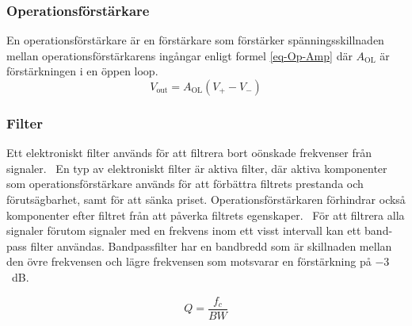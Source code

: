 \documentclass[a4paper]{article}
\begin{document}
\begin{sloppypar}
    \subsubsection{Operationsförstärkare}
    En operationsförstärkare är en förstärkare som förstärker spänningsskillnaden mellan operationsförstärkarens ingångar enligt formel \ref{eq-Op-Amp} där $A_{\textrm{OL}}$ är förstärkningen i en öppen loop.~\cite{wiki:Operational-amplifier}
    \begin{equation}
        \label{eq-Op-Amp}
        V_{\textrm{out}} = A_{\textrm{OL}}(V_+ - V_-)
    \end{equation}


    \subsubsection{Filter}
    Ett elektroniskt filter används för att filtrera bort oönskade frekvenser från signaler.~\cite{wiki:Electronic-filter}
    En typ av elektroniskt filter är aktiva filter, där aktiva komponenter som operationsförstärkare används för att förbättra filtrets prestanda och förutsägbarhet, samt för att sänka priset.
    Operationsförstärkaren förhindrar också komponenter efter filtret från att påverka filtrets egenskaper.~\cite{wiki:Active-filter}
    För att filtrera alla signaler förutom signaler med en frekvens inom ett visst intervall kan ett band-pass filter användas.
    Bandpassfilter har en bandbredd som är skillnaden mellan den övre frekvensen och lägre frekvensen som motsvarar en förstärkning på $-3$~dB.~\cite{wiki:Band-pass-filter}

    \begin{equation}
        \label{eq-Q}
        Q = \frac{f_{c}}{BW}
    \end{equation}


\end{sloppypar}
\end{document}
